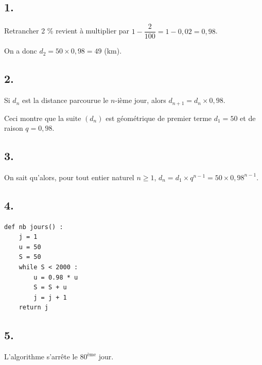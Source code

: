 \subsection*{1.}

Retrancher 2 \% revient à multiplier par \(1 - \dfrac{2}{100} = 1 - 0{,}02 = 0{,}98\).

On a donc \(d_2 = 50 \times 0{,}98 = 49\) (km).

\subsection*{2.}

Si \(d_n\) est la distance parcourue le \(n\)-ième jour, alors \(d_{n+1} = d_n \times 0{,}98\).

Ceci montre que la suite \((d_n)\) est géométrique de premier terme \(d_1 = 50\) et de raison \(q = 0{,}98\).

\subsection*{3.}

On sait qu'alors, pour tout entier naturel \(n \geqslant 1\), \(d_n = d_1 \times q^{n-1} = 50 \times 0{,}98^{n-1}\).

\subsection*{4.}

\begin{center}
\begin{lstlisting}[style=python]
def nb jours() :
    j = 1
    u = 50
    S = 50
    while S < 2000 :
        u = 0.98 * u
        S = S + u
        j = j + 1
    return j
\end{lstlisting}
\end{center}

\subsection*{5.}

L'algorithme s'arrête le \(80^{\text{ème}}\) jour.
